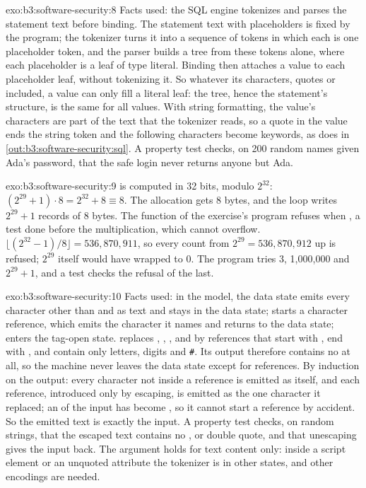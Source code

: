 \begin{solution}{exo:b3:software-security:8}
Facts used: the SQL engine tokenizes and parses the statement text before binding. The statement text with placeholders is fixed by the program; the tokenizer turns it into a sequence of tokens in which each  is one placeholder token, and the parser builds a tree from these tokens alone, where each placeholder is a leaf of type literal. Binding then attaches a value to each placeholder leaf, without tokenizing it. So whatever its characters, quotes or \code{--} included, a value can only fill a literal leaf: the tree, hence the statement's structure, is the same for all values. With string formatting, the value's characters are part of the text that the tokenizer reads, so a quote in the value ends the string token and the following characters become keywords, as  does in \cref{out:b3:software-security:sql}. A property test checks, on 200 random names given Ada's password, that the safe login never returns anyone but Ada.
\end{solution}

\begin{solution}{exo:b3:software-security:9}
 is computed in 32 bits, modulo $2^{32}$: $(2^{29} + 1) \cdot 8 = 2^{32} + 8 \equiv 8$. The allocation gets 8 bytes, and the loop writes $2^{29} + 1$ records of 8 bytes. The function  of the exercise's program refuses when , a test done before the multiplication, which cannot overflow. $\lfloor (2^{32} - 1)/8 \rfloor = 536{,}870{,}911$, so every count from $2^{29} = 536{,}870{,}912$ up is refused; $2^{29}$ itself would have wrapped to 0. The program tries 3, 1,000,000 and $2^{29} + 1$, and a test checks the refusal of the last.
\end{solution}

\begin{solution}{exo:b3:software-security:10}
Facts used: in the model, the data state emits every character other than \code{<} and \code{&} as text and stays in the data state; \code{&} starts a character reference, which emits the character it names and returns to the data state; \code{<} enters the tag-open state.  replaces \code{&}, \code{<}, \code{>},  and  by references that start with \code{&}, end with \code{;}, and contain only letters, digits and \texttt{\#}. Its output therefore contains no \code{<} at all, so the machine never leaves the data state except for references. By induction on the output: every character not inside a reference is emitted as itself, and each reference, introduced only by escaping, is emitted as the one character it replaced; an \code{&} of the input has become , so it cannot start a reference by accident. So the emitted text is exactly the input. A property test checks, on random strings, that the escaped text contains no \code{<}, \code{>} or double quote, and that unescaping gives the input back. The argument holds for text content only: inside a script element or an unquoted attribute the tokenizer is in other states, and other encodings are needed.
\end{solution}

